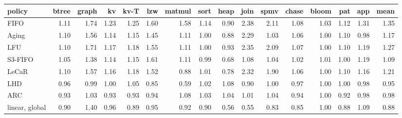\begin{tabular}{lrrrrrrrrrrrrrrr}
\toprule
policy & btree & graph & kv & kv-T & lzw & matmul & sort & heap & join & spmv & chase & bloom & pat & app & mean \\
\midrule
FIFO & 1.11 & 1.74 & 1.23 & 1.25 & 1.60 & 1.58 & 1.14 & 0.90 & 2.38 & 2.11 & 1.08 & 1.03 & 1.12 & 1.31 & 1.35 \\
Aging & 1.10 & 1.56 & 1.14 & 1.15 & 1.45 & 1.11 & 1.00 & 0.88 & 2.29 & 1.03 & 1.06 & 1.00 & 1.10 & 0.98 & 1.17 \\
LFU & 1.10 & 1.71 & 1.17 & 1.18 & 1.55 & 1.11 & 1.00 & 0.93 & 2.35 & 2.09 & 1.07 & 1.00 & 1.10 & 1.19 & 1.27 \\
S3-FIFO & 1.05 & 1.38 & 1.14 & 1.15 & 1.61 & 1.11 & 0.99 & 0.68 & 1.08 & 1.04 & 1.02 & 1.01 & 1.00 & 1.19 & 1.09 \\
LeCaR & 1.10 & 1.57 & 1.16 & 1.18 & 1.52 & 0.88 & 1.01 & 0.78 & 2.32 & 1.90 & 1.06 & 1.00 & 1.10 & 1.16 & 1.21 \\
LHD & 0.96 & 0.99 & 1.00 & 1.05 & 0.85 & 0.59 & 1.02 & 1.08 & 0.90 & 1.00 & 0.97 & 1.00 & 1.00 & 0.98 & 0.95 \\
ARC & 0.93 & 1.03 & 0.93 & 0.93 & 0.94 & 1.08 & 1.03 & 1.04 & 1.01 & 1.04 & 0.94 & 1.00 & 0.92 & 0.98 & 0.98 \\
linear, global & 0.90 & 1.40 & 0.96 & 0.89 & 0.95 & 0.92 & 0.90 & 0.56 & 0.55 & 0.83 & 0.85 & 1.00 & 0.88 & 1.09 & 0.88 \\
\bottomrule
\end{tabular}
